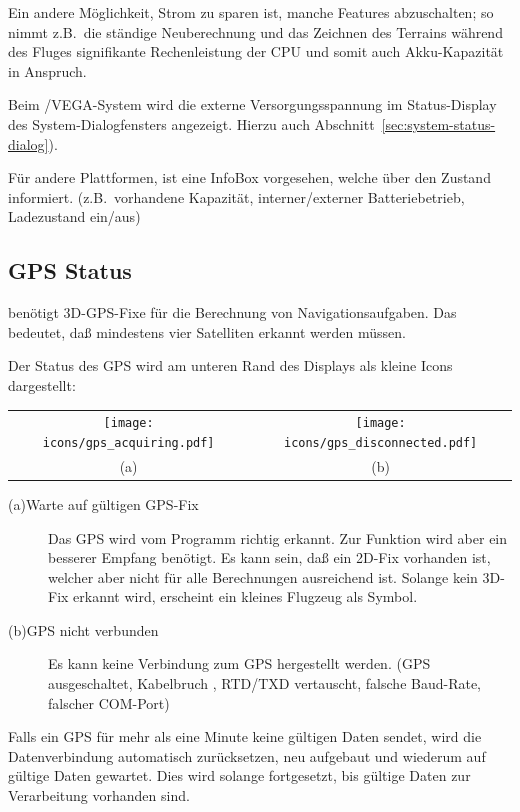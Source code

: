 Ein andere Möglichkeit, Strom zu sparen ist, manche Features abzuschalten; so nimmt z.B.\ die ständige Neuberechnung und das Zeichnen des Terrains während des Fluges signifikante Rechenleistung der CPU und somit auch Akku-Kapazität in Anspruch.

Beim \al/VEGA-System wird die externe Versorgungsspannung im Status-Display des System-Dialogfensters angezeigt.  Hierzu auch Abschnitt~\ref{sec:system-status-dialog}).

Für andere Plattformen, ist eine  InfoBox vorgesehen, welche über den Zustand informiert.
(z.B.\ vorhandene Kapazität, interner/externer Batteriebetrieb, Ladezustand ein/aus)

\subsection*{GPS Status}

\xc benötigt 3D-GPS-Fixe für die Berechnung von Navigationsaufgaben. Das bedeutet, daß mindestens vier Satelliten erkannt werden müssen.

Der Status des GPS wird am unteren Rand des Displays als kleine Icons dargestellt:

\begin{center}\begin{tabular}{c c}%
\texttt{[image: icons/gps\_acquiring.pdf]} & \texttt{[image: icons/gps\_disconnected.pdf]}\\
(a) & (b)
\end{tabular}\end{center}

\begin{description}
\item[(a)\quad Warte auf gültigen GPS-Fix]  Das GPS wird vom Programm richtig erkannt. Zur Funktion wird aber ein besserer Empfang benötigt. Es kann sein, daß ein 2D-Fix vorhanden ist, welcher aber nicht für alle Berechnungen ausreichend ist. Solange kein 3D-Fix erkannt wird, erscheint ein kleines Flugzeug als Symbol.

\item[(b)\quad GPS nicht verbunden]  Es kann keine Verbindung zum GPS hergestellt werden.
 (GPS ausgeschaltet, Kabelbruch , RTD/TXD vertauscht, falsche Baud-Rate, falscher COM-Port)
\end{description}

Falls ein GPS für mehr als eine Minute keine gültigen Daten sendet, wird \xc die Datenverbindung automatisch zurücksetzen, neu aufgebaut und wiederum auf gültige Daten gewartet. Dies wird solange fortgesetzt, bis gültige Daten zur Verarbeitung vorhanden sind. 

